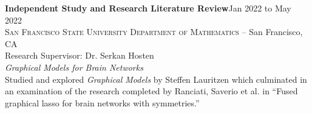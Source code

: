 \documentclass[hidelinks, 10pt]{article}
\begin{document}
\begin{minipage}[ct]{0.9\linewidth}
    \textbf{Independent Study and Research Literature Review}\hfill Jan 2022 to May 2022\\
    \textsc{San Francisco State University Department of Mathematics} -- San Francisco, CA\\
    Research Supervisor: Dr. Serkan Hosten\vspace{1mm}\\
    {\textit{Graphical Models for Brain Networks}}\\
    Studied and explored \emph{Graphical Models} by Steffen Lauritzen which
    culminated in an examination of the research completed by Ranciati, Saverio et
    al. in ``Fused graphical lasso for brain networks with symmetries.''
\end{minipage}

\vspace*{\fill}
\pagebreak
{}
\vspace*{\fill}
\end{document}
